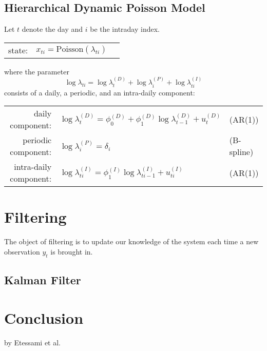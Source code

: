 \documentclass[11pt, oneside]{scrreprt}   	%
\begin{document}
\section{Hierarchical Dynamic Poisson Model}
Let $t$ denote the day and $i$ be the intraday index.

\begin{center}
\begin{tabular}{ r r l }
  state: & $x_{ti} = \text{Poisson}(\lambda_{ti})$\\
\end{tabular}
\end{center}

where the parameter
$$
\log \lambda_{ti} = \log \lambda_t^{(D)} + \log \lambda_i^{(P)} + \log \lambda_{ti}^{(I)}  
$$
consists of a daily, a periodic, and an intra-daily component:
\begin{center}
\begin{tabular}{ r l l }
  daily component: & $\log \lambda_t^{(D)} = \phi_0^{(D)} + \phi_1^{(D)} \log \lambda_{t-1}^{(D)}  + u_t^{(D)}$ & (AR(1)) \\
  periodic component: & $\log \lambda_i^{(P)} = \delta_i$ & (B-spline) \\
  intra-daily component: & $\log \lambda_{ti}^{(I)} = \phi_1^{(I)} \log \lambda_{ti-1}^{(I)}  + u_{ti}^{(I)}$ & (AR(1)) \\
\end{tabular}
\end{center}


\chapter{Filtering}
\label{chp:filtering}
The object of filtering is to update our knowledge of the system each time a new observation $y_t$ is brought in.

\section{Kalman Filter}



\chapter{Conclusion}
\label{chp:conclusion}
by Etessami et al.\cite{etessami2014_2}



\end{document}
